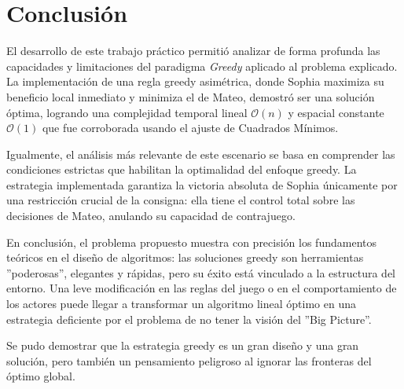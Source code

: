 \section{Conclusión}

El desarrollo de este trabajo práctico permitió analizar de forma profunda las capacidades y limitaciones del paradigma \textit{Greedy} aplicado al problema explicado. 
La implementación de una regla greedy asimétrica, donde Sophia maximiza su beneficio local inmediato y minimiza el de Mateo, demostró ser una solución óptima, logrando una complejidad temporal lineal $\mathcal{O}(n)$ y espacial constante $\mathcal{O}(1)$ que fue corroborada usando el ajuste de Cuadrados Mínimos.

Igualmente, el análisis más relevante de este escenario se basa en comprender las condiciones estrictas que habilitan la optimalidad del enfoque greedy. La estrategia implementada garantiza la victoria absoluta de Sophia únicamente por una restricción crucial de la consigna: ella tiene el control total sobre las decisiones de Mateo, anulando su capacidad de contrajuego. 

En conclusión, el problema propuesto muestra con precisión los fundamentos teóricos en el diseño de algoritmos: las soluciones greedy son herramientas ''poderosas'', elegantes y rápidas, pero su éxito está vinculado a la estructura del entorno. 
Una leve modificación en las reglas del juego o en el comportamiento de los actores puede llegar a transformar un algoritmo lineal óptimo en una estrategia deficiente por el problema de no tener la visión del ''Big Picture''. 

Se pudo demostrar que la estrategia greedy es un gran diseño y una gran solución, pero también un pensamiento peligroso al ignorar las fronteras del óptimo global.
